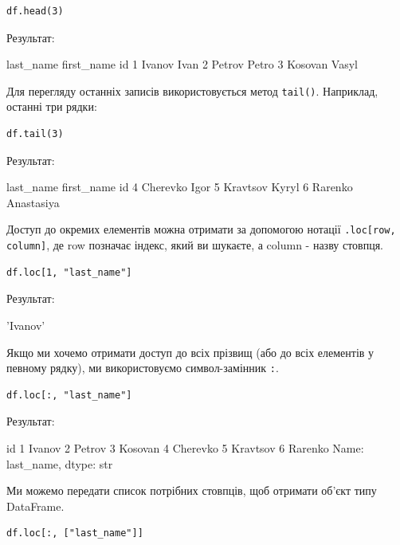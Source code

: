 \begin{lstlisting}
df.head(3)
\end{lstlisting}

Результат:

\begin{console}
	last_name	first_name
id		
1	Ivanov	Ivan
2	Petrov	Petro
3	Kosovan	Vasyl
\end{console}

Для перегляду останніх записів використовується метод \verb|tail()|. Наприклад, останні три рядки:

\begin{lstlisting}
df.tail(3)
\end{lstlisting}

Результат:

\begin{console}
   last_name	first_name
id		
4	Cherevko	Igor
5	Kravtsov	Kyryl
6	Rarenko	Anastasiya
\end{console}

Доступ до окремих елементів можна отримати за допомогою нотації \verb|.loc[row, column]|, 
де row позначає індекс, який ви шукаєте, а column - назву стовпця.

\begin{lstlisting}
df.loc[1, "last_name"]
\end{lstlisting}

Результат:

\begin{console}
'Ivanov'
\end{console}

Якщо ми хочемо отримати доступ до всіх прізвищ (або до всіх елементів у певному рядку), 
ми використовуємо символ-замінник \verb|:|.

\begin{lstlisting}
df.loc[:, "last_name"]
\end{lstlisting}

Результат:

\begin{console}
id
1      Ivanov
2      Petrov
3     Kosovan
4    Cherevko
5    Kravtsov
6     Rarenko
Name: last_name, dtype: str
\end{console}

Ми можемо передати список потрібних стовпців, щоб отримати об’єкт типу DataFrame.

\begin{lstlisting}
df.loc[:, ["last_name"]]
\end{lstlisting}

